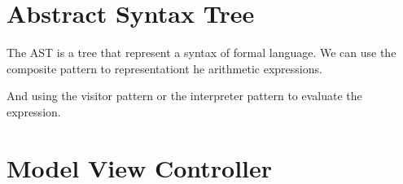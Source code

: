 \section{Abstract Syntax Tree}

The AST is a tree that represent a syntax of formal language.
We can use the composite pattern to representationt he arithmetic expressions.

And using the visitor pattern or the interpreter pattern to evaluate the expression.

\section{Model View Controller}











